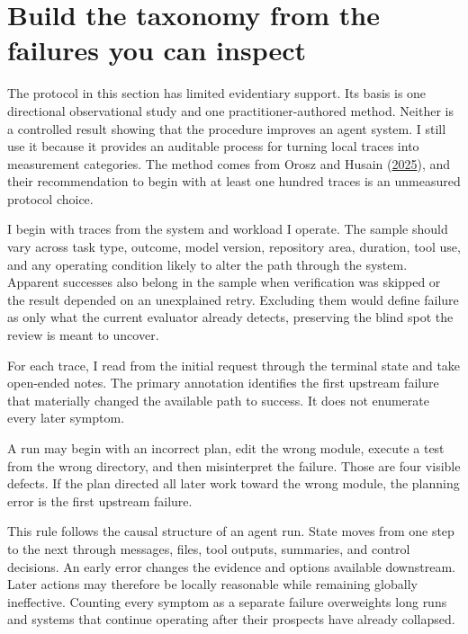 \hypertarget{build-the-taxonomy-from-the-failures-you-can-inspect}{%
\section{Build the taxonomy from the failures you can inspect}\label{build-the-taxonomy-from-the-failures-you-can-inspect}}

The protocol in this section has limited evidentiary support. Its basis is one directional observational study and one practitioner-authored method. Neither is a controlled result showing that the procedure improves an agent system. I still use it because it provides an auditable process for turning local traces into measurement categories. The method comes from Orosz and Husain (\href{https://newsletter.pragmaticengineer.com/p/evals}{2025}), and their recommendation to begin with at least one hundred traces is an unmeasured protocol choice.

I begin with traces from the system and workload I operate. The sample should vary across task type, outcome, model version, repository area, duration, tool use, and any operating condition likely to alter the path through the system. Apparent successes also belong in the sample when verification was skipped or the result depended on an unexplained retry. Excluding them would define failure as only what the current evaluator already detects, preserving the blind spot the review is meant to uncover.

For each trace, I read from the initial request through the terminal state and take open-ended notes. The primary annotation identifies the first upstream failure that materially changed the available path to success. It does not enumerate every later symptom.

A run may begin with an incorrect plan, edit the wrong module, execute a test from the wrong directory, and then misinterpret the failure. Those are four visible defects. If the plan directed all later work toward the wrong module, the planning error is the first upstream failure.

This rule follows the causal structure of an agent run. State moves from one step to the next through messages, files, tool outputs, summaries, and control decisions. An early error changes the evidence and options available downstream. Later actions may therefore be locally reasonable while remaining globally ineffective. Counting every symptom as a separate failure overweights long runs and systems that continue operating after their prospects have already collapsed.


